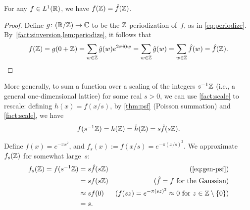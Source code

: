 \documentclass[11pt]{article}
\begin{document}
\begin{theorem}
  \label{thm:psf}
  For any $f \in L^{1}(\mathbb{R})$, we have $f(\mathbb{Z}) = \hat{f}(\mathbb{Z})$.
\end{theorem}

\begin{proof}
  Define $g \colon (\mathbb{R}/\mathbb{Z}) \to \mathbb{C}$ to be the $\mathbb{Z}$-periodization
  of~$f$, as in \cref{eq:periodize}.
  By~\cref{fact:sinversion,lem:periodize}, it follows that
  \[ f(\mathbb{Z}) = g(0+\mathbb{Z}) = \sum_{w \in \mathbb{Z}} \hat{g}(w) e^{2 \pi i 0 w} =
    \sum_{w \in \mathbb{Z}} \hat{g}(w) = \sum_{w \in \mathbb{Z}} \hat{f}(w) =
    \hat{f}(\mathbb{Z}) . \]
\end{proof}

More generally, to sum a function over a scaling of the integers
$s^{-1} \mathbb{Z}$ (i.e., a general one-dimensional lattice) for some real
$s > 0$, we can use \cref{fact:scale} to rescale: defining
$h(x) = f(x/s)$, by \cref{thm:psf} (Poisson summation) and
\cref{fact:scale}, we have
\begin{equation}
  \label{eq:gen-psf}
  f(s^{-1} \mathbb{Z}) = h(\mathbb{Z}) = \hat{h}(\mathbb{Z}) = s \hat{f}(s \mathbb{Z}) .
\end{equation}

\begin{example}
  Define $f(x) = e^{-\pi x^2}$, and
  $f_s(x) := f(x/s) = e^{-\pi (x/s)^2}$. We approximate
  $f_s(\mathbb{Z})$ for somewhat large~$s$:
  \begin{align*}
    f_s(\Z) = f(s^{-1} \Z)
    &= s \hat{f}(s\Z)
    & \text{(\cref{eq:gen-psf})} \\
    &= s f(s\Z)
    & \text{($\hat{f} = f$ for the Gaussian)} \\
    &\approx s f(0)
    & \text{($f(sz) = e^{-\pi (sz)^{2}} \approx 0$ for $z \in \Z
      \setminus \set{0}$)} \\
    &= s.
  \end{align*}
\end{example}

% 
% 
\end{document}
